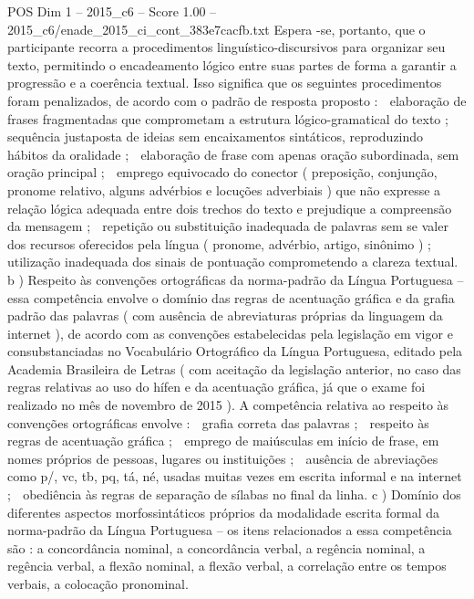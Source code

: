 \begin{textsample}{POS Dim 1 – 2015\_c6 – Score 1.00 – 2015\_c6/enade\_2015\_ci\_cont\_383e7cacfb.txt}
Espera -se, portanto, que o participante recorra a procedimentos linguístico-discursivos para organizar seu texto, permitindo o encadeamento lógico entre suas partes de forma a garantir a progressão e a coerência textual.
Isso significa que os seguintes procedimentos foram penalizados, de acordo com o padrão de resposta proposto :  elaboração de frases fragmentadas que comprometam a estrutura lógico-gramatical do texto ;  sequência justaposta de ideias sem encaixamentos sintáticos, reproduzindo hábitos da oralidade ;  elaboração de frase com apenas oração subordinada, sem oração principal ;  emprego equivocado do conector ( preposição, conjunção, pronome relativo, alguns advérbios e locuções adverbiais ) que não expresse a relação lógica adequada entre dois trechos do texto e prejudique a compreensão da mensagem ;  repetição ou substituição inadequada de palavras sem se valer dos recursos oferecidos pela língua ( pronome, advérbio, artigo, sinônimo ) ;  utilização inadequada dos sinais de pontuação comprometendo a clareza textual. b ) Respeito às convenções ortográficas da norma-padrão da Língua Portuguesa – essa competência envolve o domínio das regras de acentuação gráfica e da grafia padrão das palavras ( com ausência de abreviaturas próprias da linguagem da internet ), de acordo com as convenções estabelecidas pela legislação em vigor e consubstanciadas no Vocabulário Ortográfico da Língua Portuguesa, editado pela Academia Brasileira de Letras ( com aceitação da legislação anterior, no caso das regras relativas ao uso do hífen e da acentuação gráfica, já que o exame foi realizado no mês de novembro de 2015 ).
A competência relativa ao respeito às convenções ortográficas envolve :  grafia correta das palavras ;  respeito às regras de acentuação gráfica ;  emprego de maiúsculas em início de frase, em nomes próprios de pessoas, lugares ou instituições ;  ausência de abreviações como p/, vc, tb, pq, tá, né, usadas muitas vezes em escrita informal e na internet ;  obediência às regras de separação de sílabas no final da linha. c ) Domínio dos diferentes aspectos morfossintáticos próprios da modalidade escrita formal da norma-padrão da Língua Portuguesa – os itens relacionados a essa competência são : a concordância nominal, a concordância verbal, a regência nominal, a regência verbal, a flexão nominal, a flexão verbal, a correlação entre os tempos verbais, a colocação pronominal.

\end{textsample}
